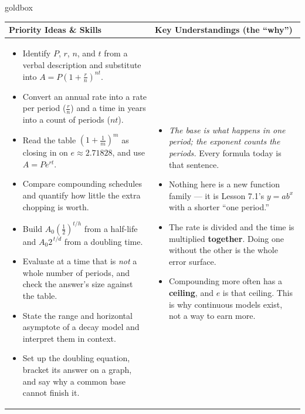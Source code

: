 \documentclass[10pt]{article}
\begin{document}
\renewcommand{\arraystretch}{1.4}
\begin{skillbox}{goldbox}
\begin{tabularx}{\linewidth}{@{}X|X@{}}
\textbf{Priority Ideas \& Skills} & \textbf{Key Understandings (the ``why'')} \\[2pt]
\hline
\vspace{-6pt}
\begin{itemize}[leftmargin=1.1em, nosep, after=\vspace{2pt}]
  \item Identify $P$, $r$, $n$, and $t$ from a verbal description and substitute into $A=P\left(1+\frac{r}{n}\right)^{nt}$.
  \item Convert an annual rate into a rate per period ($\frac{r}{n}$) and a time in years into a count of periods ($nt$).
  \item Read the table $\left(1+\frac1m\right)^{m}$ as closing in on $e\approx2.71828$, and use $A=Pe^{rt}$.
  \item Compare compounding schedules and quantify how little the extra chopping is worth.
  \item Build $A_{0}\left(\frac12\right)^{t/h}$ from a half-life and $A_{0}2^{\,t/d}$ from a doubling time.
  \item Evaluate at a time that is \emph{not} a whole number of periods, and check the answer's size against the table.
  \item State the range and horizontal asymptote of a decay model and interpret them in context.
  \item Set up the doubling equation, bracket its answer on a graph, and say why a common base cannot finish it.
\end{itemize}
&
\vspace{-6pt}
\begin{itemize}[leftmargin=1.1em, nosep, after=\vspace{2pt}]
  \item \emph{The base is what happens in one period; the exponent counts the periods.} Every formula today is that sentence.
  \item Nothing here is a new function family --- it is Lesson 7.1's $y=ab^{x}$ with a shorter ``one period.''
  \item The rate is divided and the time is multiplied \textbf{together}. Doing one without the other is the whole error surface.
  \item Compounding more often has a \textbf{ceiling}, and $e$ is that ceiling. This is why continuous models exist, not a way to earn more.

\end{itemize}
\end{tabularx}
\end{skillbox}
\end{document}
